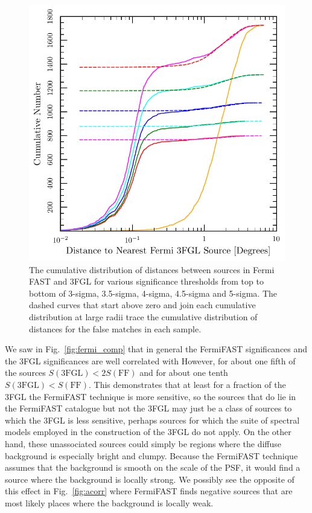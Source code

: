 \documentclass[useAMS,usenatbib]{mn2e}
\begin{document}
\begin{figure}
  \includegraphics[width=\columnwidth]{cumfflo_comp}
  \caption{The cumulative distribution of distances between sources in
    Fermi FAST and 3FGL for various significance thresholds from top
    to bottom of 3-sigma, 3.5-sigma, 4-sigma, 4.5-sigma and 5-sigma.
    The dashed curves that start above zero and join each cumulative
    distribution at large radii trace the cumulative distribution of
    distances for the false matches in each sample.}
  \label{fig:ffl_comp}
\end{figure}

We saw in Fig.~\ref{fig:fermi_comp} that in general the FermiFAST
significances and the 3FGL significances are well correlated with
However, for about one fifth of the sources $S(\mathrm{3FGL}) < 2 S(\mathrm{FF})$
and for about one tenth $S(\mathrm{3FGL}) < S(\mathrm{FF})$.
This demonstrates that at least for a fraction of
the 3FGL the FermiFAST technique is more sensitive, so the sources
that do lie in the FermiFAST catalogue but not the 3FGL may just be a
class of sources to which the 3FGL is less sensitive, perhaps sources
for which the suite of spectral models employed in the construction of
the 3FGL do not apply.  On the other hand, these unassociated sources
could simply be regions where the diffuse background is especially
bright and clumpy.  Because the FermiFAST technique assumes that the
background is smooth on the scale of the PSF, it would find a source
where the background is locally strong.  We possibly see the opposite
of this effect in Fig.~\ref{fig:acorr} where FermiFAST finds negative
sources that are most likely places where the background is locally
weak.
\end{document}
